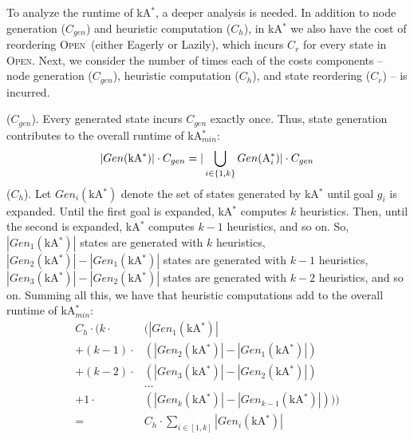 \documentclass{aicom2e}
\newcommand{\kastar}{kA$^*$}
\newcommand{\kastarmin}{kA$^*_{min}$}
\newcommand{\astari}[1]{A$^*_#1$}
\newcommand{\open}{\textsc{Open}}
\begin{document}
To analyze the runtime of \kastar{}, a deeper analysis is needed. In addition
to node generation ($C_{gen}$) and heuristic computation ($C_h$), in \kastar{}
we also have the cost of reordering \open\ (either Eagerly or Lazily), which
incurs $C_r$ for every state in \open{}. Next, we consider the number of times
each of the costs components -- node generation ($C_{gen}$), heuristic
computation ($C_h$), and state reordering ($C_r$) -- is incurred.

 ($C_{gen}$). Every generated state incurs
$C_{gen}$ exactly once. Thus, state generation contributes to the overall runtime of \kastarmin{}:
\[
|Gen(\text{\kastar{}})|\cdot C_{gen} =
|\bigcup_{i\in{\{1,k\}}} Gen(\text{\astari{i}})|\cdot C_{gen}
  \displaystyle
\]
 ($C_{h}$). 
Let $Gen_i(\text{\kastar{}})$ denote the set of states generated by \kastar{} until goal $g_i$ is expanded. 
Until the first goal is
expanded, \kastar{} computes $k$ heuristics. Then, until the second is
expanded, \kastar{} computes $k-1$ heuristics, and so on. 
So, $|Gen_1(\text{\kastar{}})|$ states are generated with
$k$ heuristics, 
$|Gen_2(\text{\kastar{}})|-|Gen_1(\text{\kastar{}})|$ states are generated with $k-1$
heuristics, $|Gen_3(\text{\kastar{}})|-|Gen_2(\text{\kastar{}})|$ states are generated with $k-2$
heuristics, and so on. Summing all this, we have that 
heuristic computations add to the overall runtime of \kastarmin{}:
\begin{align*}
    C_h\cdot ( k \cdot & (|Gen_1(\text{\kastar{}})| \\
     + (k-1) \cdot&(|Gen_2(\text{\kastar{}})|-|Gen_1(\text{\kastar{}})|)\\
     + (k-2) \cdot&(|Gen_3(\text{\kastar{}})|-|Gen_2(\text{\kastar{}})|) \\
     &\ldots\\
     + 1 \cdot&(|Gen_k(\text{\kastar{}})|-|Gen_{k-1}(\text{\kastar{}})|)))\\
     =& C_h \cdot \sum_{i\in[1,k]} |Gen_i(\text{\kastar{}})|
\end{align*}

\end{document}
